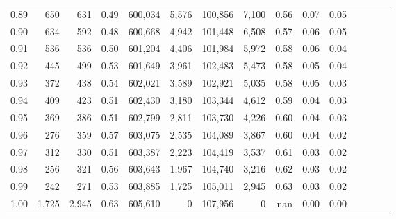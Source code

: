 \begin{tabular}{rrrcrrrrrrrrrrr}
0.89 &     650 &    631 &                                       0.49 &  600,034 &    5,576 &  100,856 &    7,100 &  0.56 &  0.07 &                         0.05 \\
0.90 &     634 &    592 &                                       0.48 &  600,668 &    4,942 &  101,448 &    6,508 &  0.57 &  0.06 &                         0.05 \\
0.91 &     536 &    536 &                                       0.50 &  601,204 &    4,406 &  101,984 &    5,972 &  0.58 &  0.06 &                         0.04 \\
0.92 &     445 &    499 &                                       0.53 &  601,649 &    3,961 &  102,483 &    5,473 &  0.58 &  0.05 &                         0.04 \\
0.93 &     372 &    438 &                                       0.54 &  602,021 &    3,589 &  102,921 &    5,035 &  0.58 &  0.05 &                         0.03 \\
0.94 &     409 &    423 &                                       0.51 &  602,430 &    3,180 &  103,344 &    4,612 &  0.59 &  0.04 &                         0.03 \\
0.95 &     369 &    386 &                                       0.51 &  602,799 &    2,811 &  103,730 &    4,226 &  0.60 &  0.04 &                         0.03 \\
0.96 &     276 &    359 &                                       0.57 &  603,075 &    2,535 &  104,089 &    3,867 &  0.60 &  0.04 &                         0.02 \\
0.97 &     312 &    330 &                                       0.51 &  603,387 &    2,223 &  104,419 &    3,537 &  0.61 &  0.03 &                         0.02 \\
0.98 &     256 &    321 &                                       0.56 &  603,643 &    1,967 &  104,740 &    3,216 &  0.62 &  0.03 &                         0.02 \\
0.99 &     242 &    271 &                                       0.53 &  603,885 &    1,725 &  105,011 &    2,945 &  0.63 &  0.03 &                         0.02 \\
1.00 &   1,725 &  2,945 &                                       0.63 &  605,610 &        0 &  107,956 &        0 &   nan &  0.00 &                         0.00 \\
\bottomrule
\end{tabular}
